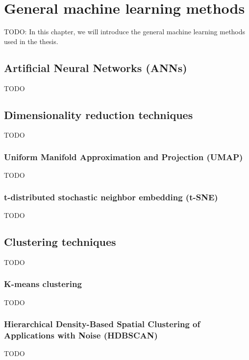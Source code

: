 \chapter{General machine learning methods}
TODO: In this chapter, we will introduce the general machine learning methods used in the thesis.

\section{Artificial Neural Networks (ANNs)}
TODO

\section{Dimensionality reduction techniques}
TODO

\subsection{Uniform Manifold Approximation and Projection (UMAP)}
TODO

\subsection{t-distributed stochastic neighbor embedding (t-SNE)}
TODO

\section{Clustering techniques}
TODO

\subsection{K-means clustering}
TODO

\subsection{Hierarchical Density-Based Spatial Clustering of Applications with Noise (HDBSCAN)}
TODO
